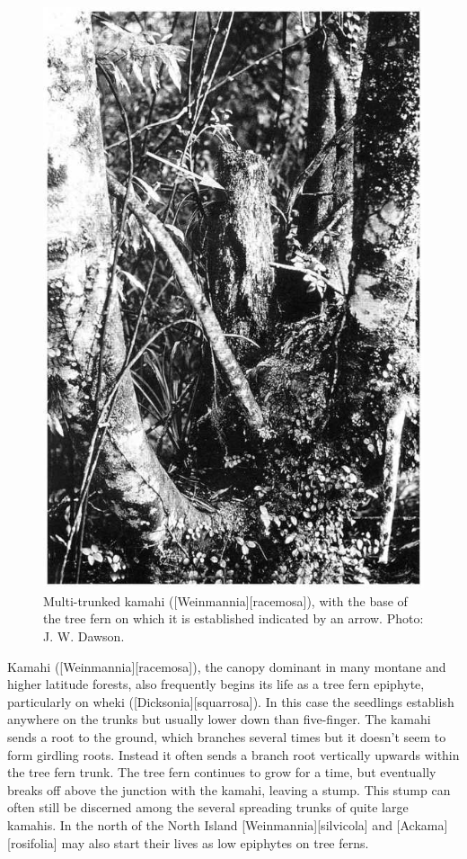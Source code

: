 \begin{figure}[htb]
\begin{minipage}[t]{0.475\textwidth}
    	\includegraphics[width=\textwidth]{graphics/figure56kamahi.jpg}
    	\caption[Multi-trunked kamahi]{Multi-trunked kamahi ([Weinmannia][racemosa]), with the base of the tree fern on which it is established indicated by an arrow.
    	Photo: J. W. Dawson.}%
    	\label{fig:56kamahi}
	\end{minipage}
\end{figure}

Kamahi ([Weinmannia][racemosa]), the canopy dominant in many montane and higher latitude forests, also frequently begins its life as a tree fern epiphyte, particularly on wheki ([Dicksonia][squarrosa]).
In this case the seedlings establish anywhere on the trunks but usually lower down than five-finger.
The kamahi sends a root to the ground, which branches several times but it doesn't seem to form girdling roots.
Instead it often sends a branch root vertically upwards within the tree fern trunk.
The tree fern continues to grow for a time, but eventually breaks off above the junction with the kamahi, leaving a stump.
This stump can often still be discerned among the several spreading trunks of quite large kamahis.
In the north of the North Island [Weinmannia][silvicola] and [Ackama][rosifolia] may also start their lives as low epiphytes on tree ferns.

